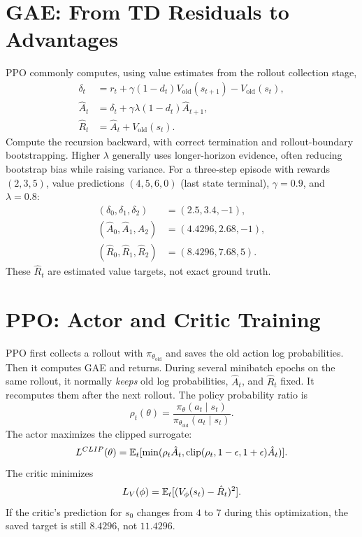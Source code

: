 \section{GAE: From TD Residuals to Advantages}
PPO commonly computes, using value estimates from the rollout collection stage,
\begin{align}
\delta_t&=r_t+\gamma(1-d_t)V_{\mathrm{old}}(s_{t+1})-V_{\mathrm{old}}(s_t),\\
\hat A_t&=\delta_t+\gamma\lambda(1-d_t)\hat A_{t+1},\\
\hat R_t&=\hat A_t+V_{\mathrm{old}}(s_t).
\end{align}
Compute the recursion backward, with correct termination and rollout-boundary bootstrapping. Higher $\lambda$ generally uses longer-horizon evidence, often reducing bootstrap bias while raising variance.
For a three-step episode with rewards $(2,3,5)$, value predictions $(4,5,6,0)$ (last state terminal), $\gamma=0.9$, and $\lambda=0.8$:
\begin{align}
(\delta_0,\delta_1,\delta_2)&=(2.5,3.4,-1),\\
(\hat A_0,\hat A_1,\hat A_2)&=(4.4296,2.68,-1),\\
(\hat R_0,\hat R_1,\hat R_2)&=(8.4296,7.68,5).
\end{align}
These $\hat R_t$ are estimated value targets, not exact ground truth.
\section{PPO: Actor and Critic Training}
PPO first collects a rollout with $\pi_{\theta_{\mathrm{old}}}$ and saves the old action log probabilities. Then it computes GAE and returns. During several minibatch epochs on the same rollout, it normally \emph{keeps} old log probabilities, $\hat A_t$, and $\hat R_t$ fixed. It recomputes them after the next rollout.
The policy probability ratio is
\begin{equation}\rho_t(\theta)=\frac{\pi_\theta(a_t\mid s_t)}{\pi_{\theta_{\mathrm{old}}}(a_t\mid s_t)}.\end{equation}
The actor maximizes the clipped surrogate:
\begin{equation}
L^{CLIP}(\theta)=\mathbb{E}_t[\min(\rho_t\hat A_t,\operatorname{clip}(\rho_t,1-\epsilon,1+\epsilon)\hat A_t)].
\end{equation}
The critic minimizes
\begin{equation}L_V(\phi)=\mathbb{E}_t[(V_\phi(s_t)-\hat R_t)^2].\end{equation}
If the critic's prediction for $s_0$ changes from $4$ to $7$ during this optimization, the saved target is still $8.4296$, not $11.4296$.
